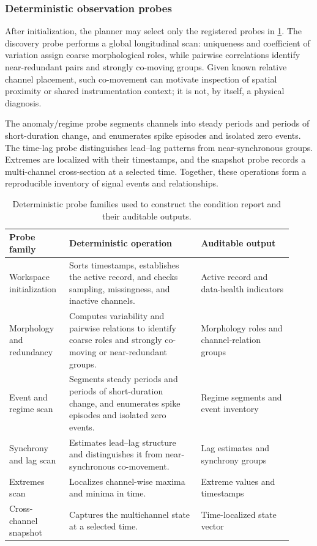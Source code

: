 \subsubsection{Deterministic observation probes}
After initialization, the planner may select only the registered probes in \cref{tab:agent-tools}. The discovery probe performs a global longitudinal scan: uniqueness and coefficient of variation assign coarse morphological roles, while pairwise correlations identify near-redundant pairs and strongly co-moving groups. Given known relative channel placement, such co-movement can motivate inspection of spatial proximity or shared instrumentation context; it is not, by itself, a physical diagnosis.

The anomaly/regime probe segments channels into steady periods and periods of short-duration change, and enumerates spike episodes and isolated zero events. The time-lag probe distinguishes lead--lag patterns from near-synchronous groups. Extremes are localized with their timestamps, and the snapshot probe records a multi-channel cross-section at a selected time. Together, these operations form a reproducible inventory of signal events and relationships.

\begin{table}[H]
  \centering
  \footnotesize
  \setlength{\tabcolsep}{3pt}
  \caption{Deterministic probe families used to construct the condition report and their auditable outputs.}
  \label{tab:agent-tools}
  \begin{tabular}{@{}>{\raggedright\arraybackslash}p{0.19\linewidth}
                    >{\raggedright\arraybackslash}p{0.43\linewidth}
                    >{\raggedright\arraybackslash}p{0.30\linewidth}@{}}
    \toprule
    \textrm{\normalfont Probe family} &
    \textrm{\normalfont Deterministic operation} &
    \textrm{\normalfont Auditable output} \\
    \midrule
    Workspace initialization &
    Sorts timestamps, establishes the active record, and checks sampling, missingness, and inactive channels. &
    Active record and data-health indicators \\
    Morphology and redundancy &
    Computes variability and pairwise relations to identify coarse roles and strongly co-moving or near-redundant groups. &
    Morphology roles and channel-relation groups \\
    Event and regime scan &
    Segments steady periods and periods of short-duration change, and enumerates spike episodes and isolated zero events. &
    Regime segments and event inventory \\
    Synchrony and lag scan &
    Estimates lead--lag structure and distinguishes it from near-synchronous co-movement. &
    Lag estimates and synchrony groups \\
    Extremes scan &
    Localizes channel-wise maxima and minima in time. &
    Extreme values and timestamps \\
    Cross-channel snapshot &
    Captures the multichannel state at a selected time. &
    Time-localized state vector \\
    \bottomrule
  \end{tabular}
\end{table}
